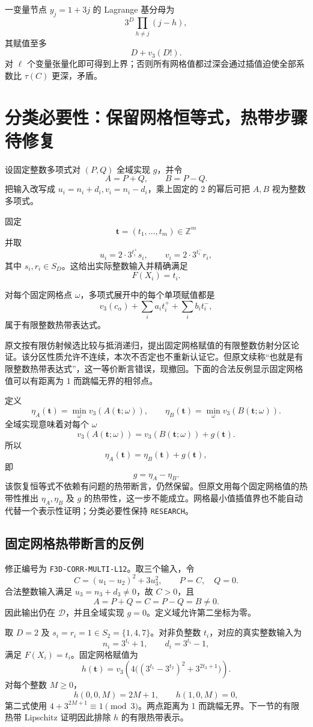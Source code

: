 \documentclass[11pt,a4paper]{ctexart}
\begin{document}
一变量节点 \(y_j=1+3j\) 的 Lagrange 基分母为
\[
3^D\prod_{h\ne j}(j-h),
\]
其赋值至多
\[
D+v_3(D!).
\]
对 \(\ell\) 个变量张量化即可得到上界；否则所有网格值都过深会通过插值迫使全部系数比 \(\tau(C)\) 更深，矛盾。

\section{分类必要性：保留网格恒等式，热带步骤待修复}
设固定整数多项式对 \((P,Q)\) 全域实现 \(g\)，并令
\[
A=P+Q,\qquad B=P-Q.
\]
把输入改写成 \(u_i=n_i+d_i,v_i=n_i-d_i\)，乘上固定的 \(2\) 的幂后可把 \(A,B\) 视为整数多项式。

固定
\[
\mathbf t=(t_1,\ldots,t_m)\in\mathbb Z^m
\]
并取
\[
u_i=2\cdot3^{t_i^+}s_i,\qquad
v_i=2\cdot3^{t_i^-}r_i,
\]
其中 \(s_i,r_i\in S_D\)。这给出实际整数输入并精确满足
\[
F(X_i)=t_i.
\]

对每个固定网格点 \(\omega\)，多项式展开中的每个单项赋值都是
\[
v_3(c_\alpha)+
\sum_i a_i t_i^+
+
\sum_i b_i t_i^-,
\]
属于有限整数热带表达式。

原文按有限仿射候选比较与抵消递归，提出固定网格赋值的有限整数仿射分区论证。该分区性质允许不连续，本次不否定也不重新认证它。但原文续称“也就是有限整数热带表达式”，这一等价断言错误，现撤回。下面的合法反例显示固定网格值可以有距离为 1 而跳幅无界的相邻点。

定义
\[
\eta_A(\mathbf t)=\min_{\omega}v_3(A(\mathbf t;\omega)),
\qquad
\eta_B(\mathbf t)=\min_{\omega}v_3(B(\mathbf t;\omega)).
\]
全域实现意味着对每个 \(\omega\)
\[
v_3(A(\mathbf t;\omega))
=
v_3(B(\mathbf t;\omega))+g(\mathbf t).
\]
所以
\[
\eta_A(\mathbf t)
=
\eta_B(\mathbf t)+g(\mathbf t),
\]
即
\[
\boxed{g=\eta_A-\eta_B.}
\]
该恢复恒等式不依赖有问题的热带断言，仍然保留。但原文用每个固定网格值的热带性推出 \(\eta_A,\eta_B\) 及 \(g\) 的热带性，这一步不能成立。网格最小值插值界也不能自动代替一个表示性证明；分类必要性保持 \texttt{RESEARCH}。

\subsection{固定网格热带断言的反例}
修正编号为 \texttt{F3D-CORR-MULTI-L12}。取三个输入，令
\[
C=(u_1-u_2)^2+3u_3^2,\qquad P=C,\quad Q=0.
\]
合法整数输入满足 \(u_3=n_3+d_3\ne0\)，故 \(C>0\)，且
\[
A=P+Q=C=P-Q=B\ne0.
\]
因此输出仍在 \(\mathcal D\)，并且全域实现 \(g=0\)。定义域允许第二坐标为零。

取 \(D=2\) 及 \(s_i=r_i=1\in S_2=\{1,4,7\}\)。对非负整数 \(t_i\)，对应的真实整数输入为
\[
n_i=3^{t_i}+1,\qquad d_i=3^{t_i}-1,
\]
满足 \(F(X_i)=t_i\)。固定网格赋值为
\[
h(\mathbf t)=v_3\!\left(4\bigl((3^{t_1}-3^{t_2})^2+3^{2t_3+1}\bigr)\right).
\]
对每个整数 \(M\ge0\)，
\[
h(0,0,M)=2M+1,\qquad h(1,0,M)=0,
\]
第二式使用 \(4+3^{2M+1}\equiv1\pmod3\)。两点距离为 1 而跳幅无界。下一节的有限热带 Lipschitz 证明因此排除 \(h\) 的有限热带表示。
\end{document}
